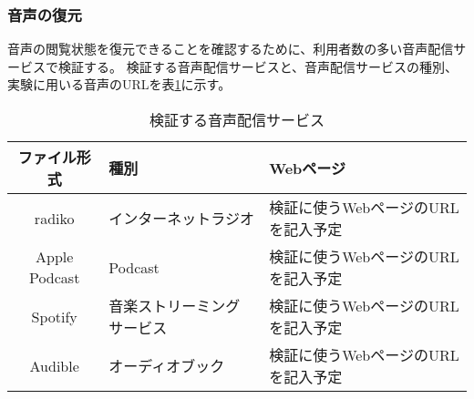 \subsubsection{音声の復元}
音声の閲覧状態を復元できることを確認するために、利用者数の多い音声配信サービスで検証する。
検証する音声配信サービスと、音声配信サービスの種別、実験に用いる音声のURLを表\ref{tb:evl-audio-check-list}に示す。

\begin{table}[htbp]
  \begin{center}
    \caption{検証する音声配信サービス}
    \label{tb:evl-audio-check-list}
    \begin{tabular}{|c|l|l|}
      \hline
      ファイル形式 & 種別 & Webページ \\\hline\hline
      radiko & インターネットラジオ & 検証に使うWebページのURLを記入予定 \\\hline
      Apple Podcast & Podcast & 検証に使うWebページのURLを記入予定 \\\hline
      Spotify & 音楽ストリーミングサービス & 検証に使うWebページのURLを記入予定 \\\hline
      Audible & オーディオブック & 検証に使うWebページのURLを記入予定 \\\hline
    \end{tabular}
  \end{center}
\end{table}
